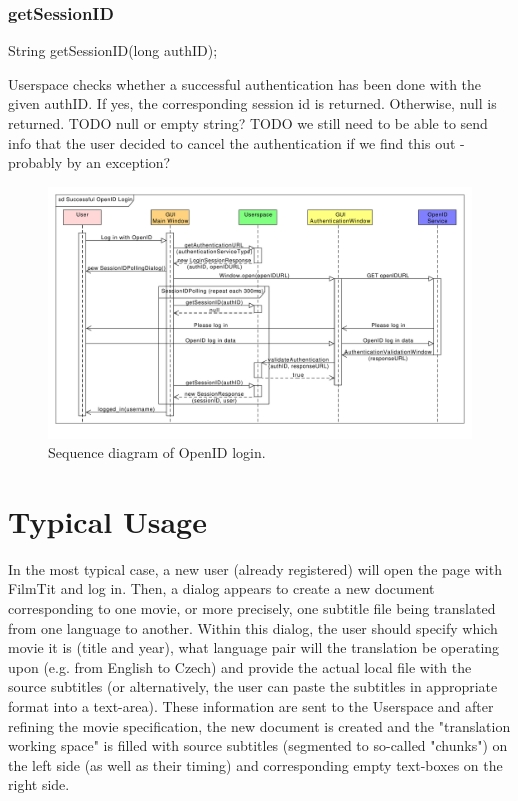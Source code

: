 \subsubsection{getSessionID}
    String getSessionID(long authID);

Userspace checks whether a successful authentication has been done with the given authID.
If yes, the corresponding session id is returned.
Otherwise, null is returned.
TODO null or empty string?
TODO we still need to be able to send info that the user decided to cancel the authentication if we find this out - probably by an exception?

\begin{figure}[h]
\begin{center}
\includegraphics[scale=0.55, angle=90]{figures/openid_login_sequence.pdf}
\end{center}
\caption{Sequence diagram of OpenID login.}\label{gui:sd:openid_login}
\end{figure}

\section{Typical Usage}
In the most typical case, a new user (already registered) will open the page with FilmTit and log in. Then, a dialog appears to create a new document corresponding to one movie, or more precisely, one subtitle file being translated from one language to another. Within this dialog, the user should specify which movie it is (title and year), what language pair will the translation be operating upon (e.g. from English to Czech) and provide the actual local file with the source subtitles (or alternatively, the user can paste the subtitles in appropriate format into a text-area). These information are sent to the Userspace and after refining the movie specification, the new document is created and the "translation working space" is filled with source subtitles (segmented to so-called "chunks") on the left side (as well as their timing) and corresponding empty text-boxes on the right side.

